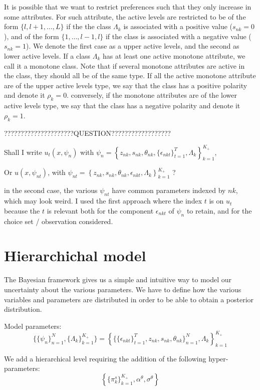 \documentclass[12pt]{article}
\begin{document}
It is possible that we want to restrict preferences such that they only increase in some attributes.
For such attribute, the active levels are restricted to be of the form $\{l,l+1,\ldots,L\}$ if the the class $\Lambda_k$ is associated with a positive value ($s_{nk}=0$), and of the form $\{1,\ldots,l-1,l\}$ if the class is associated with a negative value ($s_{nk}=1$). We denote the first case as a upper active levels, and the second as lower active levels. If a class $\Lambda_k$ has at least one active monotone attribute, we call it a monotone class.
Note that if several monotone attributes are active in the class, they should all be of the same type. If all the active monotone attribute are of the upper active levels type, we say that the class has a positive polarity and denote it $\rho_k=0$. conversely, if the monotone attributes are of the lower active levels type, we say that the class has a negative polarity and denote it $\rho_k=1$.


?????????????????????QUESTION??????????????????

Shall I write $u_t(x,\psi_n)$ with $\psi_n = \left\{ z_{nk}, s_{nk},\theta_{nk}, \{\epsilon_{nkt}\}_{t=1}^T , \Lambda_{k} \right\}_{k=1}^{K_+}$, 

Or $u(x,\psi_{nt})$, with $\psi_{nt} = \left\{ z_{nk}, s_{nk},\theta_{nk}, \epsilon_{nkt}, \Lambda_{k} \right\}_{k=1}^{K_+}$ ?

in the second case, the various $\psi_{nt}$ have common parameters indexed by $nk$, which may look weird. I used the first approach where the index $t$ is on $u_t$ because the $t$ is relevant both for the component $\epsilon_{nkt}$ of $\psi_n$ to retain, and for the choice set / observation considered. 

\section{Hierarchichal model}

The Bayesian framework gives us a simple and intuitive way to model our uncertainty about the various parameters. We have to define how the various variables and parameters are distributed in order to be able to obtain a posterior distribution.

Model parameters:
$$ \{ \{\psi_n\}_{n=1}^N,\{\Lambda_{k}\}_{k=1}^{K_+} \} 
= \left\{ \{\{\epsilon_{nkt}\}_{t=1}^T, z_{nk},s_{nk}, \theta_{nk} \}_{n=1}^N, \Lambda_{k} \right\}_{k=1}^{K_+}$$

We add a hierarchical level requiring the addition of the following hyper-parameters:
$$ \left\{  \{\pi_k^s\}_{k=1}^{K_+}, \alpha^\theta, \sigma^\theta  \right\} $$
\end{document}

